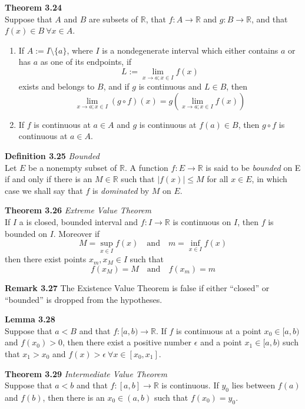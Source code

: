 \documentclass[8pt,landscape]{article}
\begin{document}
\begin{multicols}{3}
    \textbf{Theorem 3.24} \\
    Suppose that $A$ and $B$ are subsets of $\mathbb{R}$, that $f : A \to \mathbb{R}$
    and $g : B \to \mathbb{R}$, and that $f(x) \in B \ \forall x \in A$.
    \begin{enumerate}
        \item If $A := I \setminus \{a\}$, where $I$ is a nondegenerate interval which
            either contains $a$ or has $a$ as one of its endpoints, if
            \[
                L := \lim_{x \to a; x \in I} f(x)
            \]
            exists and belongs to $B$, and if $g$ is continuous and $L \in B$, then
            \[
                \lim_{x \to a; x \in I} (g \circ f) (x) =
                g \left( \lim_{x \to a; x \in I} f(x)\right)
            \]
        \item If $f$ is continuous at $a \in A$ and $g$ is continuous at $f(a) \in B$,
            then $g \circ f$ is continuous at $a \in A$.
    \end{enumerate}

    \textbf{Definition 3.25} \emph{Bounded} \\
    Let $E$ be a nonempty subset of $\mathbb{R}$.
    A function $f : E \to \mathbb{R}$ is said to be \emph{bounded} on E if and only if
    there is an $M \in \mathbb{R}$ such that $|f(x)| \leq M$ for all $x \in E$, in
    which case we shall say that $f$ is \emph{dominated} by $M$ on $E$.

    \textbf{Theorem 3.26} \emph{Extreme Value Theorem} \\
    If $I$ a is closed, bounded interval and $f : I \to \mathbb{R}$ is continuous on $I$,
    then $f$ is bounded on $I$.
    Moreover if
    \[
        M = \sup_{x \in I} f(x) \quad \text{and} \quad m = \inf_{x \in I} f(x)
    \]
    then there exist points $x_m, x_M \in I$ such that
    \[
        f(x_M) = M \quad \text{and} \quad f(x_m) = m
    \]

    \textbf{Remark 3.27}
    The Existence Value Theorem is false if either ``closed'' or ``bounded'' is dropped
    from the hypotheses.

    \textbf{Lemma 3.28} \\
    Suppose that $a < B$ and that $f : [a, b) \to \mathbb{R}$.
    If $f$ is continuous at a point $x_0 \in [a,b)$ and $f(x_0) > 0$,
    then there exist a positive number $\epsilon$ and a point
    $x_1 \in [a, b)$ such that $x_1 > x_0$ and $f(x) > \epsilon \ \forall
    x \in [x_0, x_1]$.

    \textbf{Theorem 3.29} \emph{Intermediate Value Theorem} \\
    Suppose that $a < b$ and that $f : [a, b] \to \mathbb{R}$ is continuous.
    If $y_0$ lies between $f(a)$ and $f(b)$, then there is an $x_0 \in (a, b)$
    such that $f(x_0) = y_0$.


\end{multicols}
\end{document}
